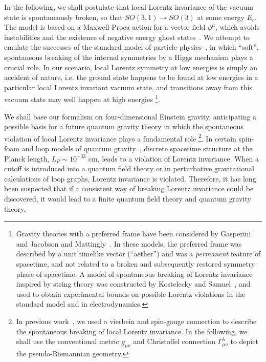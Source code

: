 \documentclass[a4paper,12pt]{article}
\begin{document}
In the following, we shall postulate that local Lorentz invariance of the vacuum
state is spontaneously broken, so that $SO(3,1)\rightarrow SO(3)$ at some energy
$E_c$. The model is based on a Maxwell-Proca action for a vector field $\phi^\mu$,
which avoids instabilities and the existence of negative energy ghost
states~\cite{Isenberg,Clayton}. We attempt to emulate the successes of the standard
model of particle physics~\cite{Cheng}, in which ``soft'', spontaneous breaking of
the internal symmetries by a Higgs mechanism plays a crucial role. In our scenario,
local Lorentz symmetry at low energies is simply an accident of nature, i.e. the
ground state happens to be found at low energies in a particular local Lorentz
invariant vacuum state, and transitions away from this vacuum state may well happen
at high energies \footnote{Gravity theories with a preferred frame have been
considered by Gasperini~\cite{Gasperini} and Jacobson and Mattingly~\cite{Jacobson}.
In these models, the preferred frame was described by a unit timelike vector
(``aether'') and was a {\it permanent} feature of spacetime, and not related to a
broken and subsequently restored symmetry phase of spacetime. A model of spontaneous
breaking of Lorentz invariance inspired by string theory was constructed by
Kostelecky and Samuel~\cite{Samuel,Kostelecky,Lehnert}, and used to obtain
experimental bounds on possible Lorentz violations in the standard model and in
electrodynamics.}.

We shall base our formalism on four-dimensional Einstein gravity,
anticipating a possible basis for a future quantum gravity theory in which the
spontaneous violation of local Lorentz invariance plays a fundamental role
\footnote{In previous work~\cite{Moffat,Moffat2}, we used a vierbein and
spin-gauge connection to describe the spontaneous breaking of local Lorentz
invariance. In the following, we shall use the conventional metric
$g_{\mu\nu}$ and Christoffel connection $\Gamma^\lambda_{\mu\nu}$ to depict the
pseudo-Riemannian geometry.}. In certain
spin-foam and loop models of quantum gravity~\cite{Smolin,Oriti}, discrete spacetime
structure at the Planck length, $L_P\sim 10^{-33}$ cm, leads to a violation of
Lorentz invariance. When a cutoff is introduced into a quantum field theory or in
perturbative gravitational calculations of loop graphs, Lorentz invariance is
violated. Therefore, it has long been suspected that if a consistent way of breaking
Lorentz invariance could be discovered, it would lead to a finite quantum field
theory and quantum gravity theory.
\end{document}
